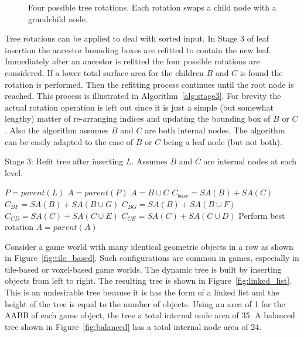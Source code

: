 \documentclass{article}
\begin{document}
\begin{figure}
	\begin{center}
		
	\end{center}
	\caption{Four possible tree rotations. Each rotation swaps a child node with a grandchild node.}
	\label{fig:possible_rotations}
\end{figure}

Tree rotations can be applied to deal with sorted input. In Stage 3 of leaf insertion the ancestor bounding boxes are refitted to contain the new leaf. Immediately after an ancestor is refitted the four possible rotations are considered. If a lower total surface area for the children $B$ and $C$ is found the rotation is performed. Then the refitting process continues until the root node is reached. This process is illustrated in Algorithm~\ref{alg:stage3}. For brevity the actual rotation operation is left out since it is just a simple (but somewhat lengthy) matter of re-arranging indices and updating the bounding box of $B$ or $C$. Also the algorithm assumes $B$ and $C$ are both internal nodes. The algorithm can be easily adapted to the case of $B$ or $C$ being a leaf node (but not both).

\begin{algorithm}
	\caption{Stage 3: Refit tree after inserting $L$. Assumes $B$ and $C$ are internal nodes at each level.}
	\label{alg:stage3}
	\begin{algorithmic}
		\STATE $P = parent(L)$
		\STATE $A = parent(P)$
		\STATE {}
		\STATE $A = B \cup C$ 
		\STATE {}
		\STATE $C_{base} = SA(B) + SA(C)$
		\STATE $C_{BF} = SA(B) + SA(B \cup G)$
		\STATE $C_{BG} = SA(B) + SA(B \cup F)$
		\STATE $C_{CD} = SA(C) + SA(C \cup E)$
		\STATE $C_{CE} = SA(C) + SA(C \cup D)$
		\STATE Perform best rotation 
		\STATE $A = parent(A)$
		\ENDWHILE
	\end{algorithmic}
\end{algorithm}


Consider a game world with many identical geometric objects in a row as shown in Figure~\ref{fig:tile_based}. Such configurations are common in games, especially in tile-based or voxel-based game worlds. The dynamic tree is built by inserting objects from left to right. The resulting tree is shown in Figure~\ref{fig:linked_list}. This is an undesirable tree because it is has the form of a linked list and the height of the tree is equal to the number of objects. Using an area of 1 for the AABB of each game object, the tree a total internal node area of 35. A balanced tree shown in Figure~\ref{fig:balanced} has a total internal node area of 24.
\end{document}
